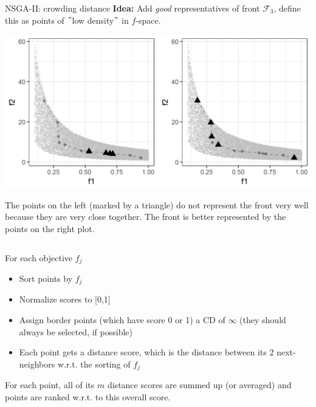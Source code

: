 \documentclass[11pt,compress,t,notes=noshow, xcolor=table]{beamer}
\begin{document}
\begin{vbframe}{NSGA-II: crowding distance}
\textbf{Idea:} Add \textit{good} representatives of front $\mathcal{F}_3$, define this as points of $"$low density$"$ in $f$-space.

\includegraphics[height = 0.5\textheight]{figure_man/NSGA2_CS1.png}

\begin{footnotesize}
The points on the left (marked by a triangle) do not represent the front very well because they are very close together. The front is better represented by the points on the right plot.
\end{footnotesize}

\framebreak

\begin{columns}
\begin{column}{0.6\textwidth}
\begin{footnotesize}
For each objective $f_j$
\begin{itemize}
\item Sort points by $f_j$
\item Normalize scores to [0,1]
\item Assign border points (which have score 0 or 1) a CD of $\infty$ (they should always be selected, if possible)
\item Each point gets a distance score, which is the distance between its 2 next-neighbors w.r.t. the sorting of $f_j$
\end{itemize}
For each point, all of its $m$ distance scores are summed up (or averaged) and points are ranked w.r.t. to this overall score.
\end{footnotesize}
\end{column}


\end{columns}
\end{vbframe}
\end{document}
